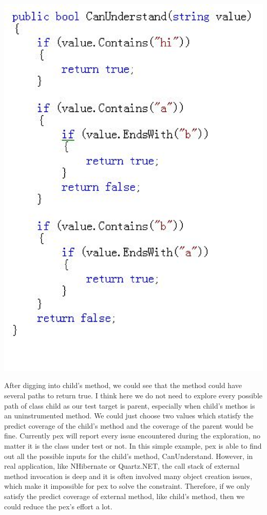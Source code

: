 \begin{center}
	\includegraphics[scale=0.42,keepaspectratio]{code2.eps}
\end{center}

After digging into child's method, we could see that the method could have several paths to return true. I think here we do not need to explore every possible path of class child as our test target is parent, especially when child's methos is an uninstrumented method. We could just choose two values which statisfy the predict coverage of the child's method and the coverage of the parent would be fine. Currently pex will report every issue encountered during the exploration, no matter it is the class under test or not. In this simple example, pex is able to find out all the possible inputs for the child's method, CanUnderstand. However, in real application, like NHibernate or Quartz.NET, the call stack of external method invocation is deep and it is often involved many object creation issues, which make it impossible for pex to solve the constraint. Therefore, if we only satisfy the predict coverage of external method, like child's method, then we could reduce the pex's effort a lot.

